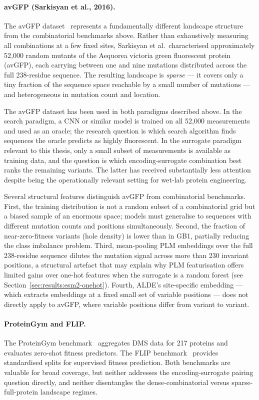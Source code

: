 \documentclass[english, 12pt, a4paper, elec, utf8, a-2b, online]{aaltothesis}
\begin{document}
\paragraph{avGFP (Sarkisyan et al., 2016).}
The avGFP dataset~\cite{Sarkisyan2016} represents a fundamentally different landscape structure
from the combinatorial benchmarks above.
Rather than exhaustively measuring all combinations at a few fixed sites, Sarkisyan et al.\
characterised approximately 52,000 random mutants of the Aequorea victoria green fluorescent
protein (avGFP), each carrying between one and nine mutations distributed across the full
238-residue sequence.
The resulting landscape is \emph{sparse} --- it covers only a tiny fraction of the sequence
space reachable by a small number of mutations --- and heterogeneous in mutation count
and location.

The avGFP dataset has been used in both paradigms described above.
In the search paradigm, a CNN or similar model is trained on all 52,000 measurements and
used as an oracle; the research question is which search algorithm finds sequences the oracle
predicts as highly fluorescent.
In the surrogate paradigm relevant to this thesis, only a small subset of measurements is
available as training data, and the question is which encoding-surrogate combination best
ranks the remaining variants.
The latter has received substantially less attention despite being the operationally relevant
setting for wet-lab protein engineering.

Several structural features distinguish avGFP from combinatorial benchmarks.
First, the training distribution is not a random subset of a combinatorial grid but a biased
sample of an enormous space; models must generalise to sequences with different mutation counts
and positions simultaneously.
Second, the fraction of near-zero-fitness variants (hole density) is lower than in GB1,
partially reducing the class imbalance problem.
Third, mean-pooling PLM embeddings over the full 238-residue sequence dilutes the mutation
signal across more than 230 invariant positions, a structural artefact that may explain why
PLM featurisation offers limited gains over one-hot features when the surrogate is a random
forest (see Section~\ref{sec:results:esm2-onehot}).
Fourth, ALDE's site-specific embedding --- which extracts embeddings at a fixed small set of
variable positions --- does not directly apply to avGFP, where variable positions differ
from variant to variant.

\paragraph{ProteinGym and FLIP.}
The ProteinGym benchmark~\cite{Notin2023ProteinGym} aggregates DMS data for 217 proteins and
evaluates zero-shot fitness predictors.
The FLIP benchmark~\cite{Dallago2021FLIP} provides standardised splits for supervised fitness
prediction.
Both benchmarks are valuable for broad coverage, but neither addresses the encoding-surrogate
pairing question directly, and neither disentangles the dense-combinatorial versus sparse-full-protein
landscape regimes.
\end{document}
